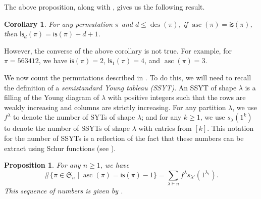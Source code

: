 \documentclass[12pt]{article}
\newcommand{\is}{\mathsf{is}}
\newcommand{\ls}{\mathsf{ls}}
\newcommand{\asc}{\operatorname{asc}}
\newcommand{\des}{\operatorname{des}}
\newcommand{\s}{\mathfrak{S}}
\newtheorem{corollary}[theorem] {Corollary}
\newtheorem{proposition}[theorem]{Proposition}
\theoremstyle{definition}
\begin{document}
The above proposition, along with , gives us the following result.

\begin{corollary}
    For any permutation $\pi$ and $d \leq \des(\pi)$, if $\asc(\pi) = \is(\pi)$, then $\ls_d(\pi) = \is(\pi) + d + 1$.
\end{corollary}

However, the converse of the above corollary is not true. 
For example, for $\pi = 5 6 3 4 1 2$, we have $\is(\pi) = 2$, $\ls_1(\pi) = 4$, and $\asc(\pi) = 3$.

We now count the permutations described in . 
To do this, we will need to recall the definition of a \emph{semistandard Young tableau (SSYT)}. 
An SSYT of shape $\lambda$ is a filling of the Young diagram of $\lambda$ with positive integers such that the rows are weakly increasing and columns are strictly increasing. 
For any partition $\lambda$, we use $f^{\lambda}$ to denote the number of SYTs of shape $\lambda$; and for any $k \geq 1$, we use $s_\lambda(1^k)$ to denote the number of SSYTs of shape $\lambda$ with entries from $[k]$. 
This notation for the number of SSYTs is a reflection of the fact that these numbers can be extract using Schur functions (see \cite[Chapter 7]{stanley_ec2}).

\begin{proposition}
    For any $n \geq 1$, we have
    \begin{equation*}
        \#\{\pi \in \s_n \mid \asc(\pi) = \is(\pi) - 1\} = \sum_{\lambda \vdash n} f^{\lambda}s_{\lambda'}(1^{\lambda_1}).
    \end{equation*}
    This sequence of numbers is given by \cite[\href{https://oeis.org/A268699}{A268699}]{oeis}.
\end{proposition}
\end{document}
